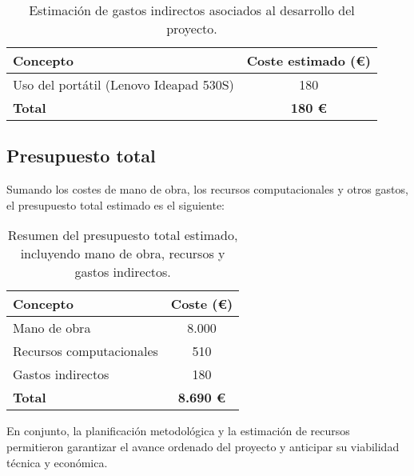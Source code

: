 \begin{table}[htp]
    \centering
    \begin{tabular}{|l|c|}
        \hline
        \textbf{Concepto}                        & \textbf{Coste estimado (€)} \\ \hline
        Uso del portátil (Lenovo Ideapad 530S)   & 180                         \\ \hline
        \textbf{Total}                           & \textbf{180 €}              \\ \hline
    \end{tabular}
    \caption{Estimación de gastos indirectos asociados al desarrollo del proyecto.}
    \label{tab:gastos-indirectos}
\end{table}


\subsection{Presupuesto total}\label{subsec:presupuesto-total}
Sumando los costes de mano de obra, los recursos computacionales y otros gastos, el presupuesto total estimado es el
siguiente:

\begin{table}[htp]
    \centering
    \begin{tabular}{|l|c|}
        \hline
        \textbf{Concepto}        & \textbf{Coste (€)} \\ \hline
        Mano de obra             & 8.000              \\
        Recursos computacionales & 510                \\
        Gastos indirectos        & 180                 \\ \hline
        \textbf{Total}           & \textbf{8.690 €}   \\ \hline
    \end{tabular}
    \caption{Resumen del presupuesto total estimado, incluyendo mano de obra, recursos y gastos indirectos.}
    \label{tab:presupuesto-total}
\end{table}

En conjunto, la planificación metodológica y la estimación de recursos permitieron garantizar el avance
ordenado del proyecto y anticipar su viabilidad técnica y económica.